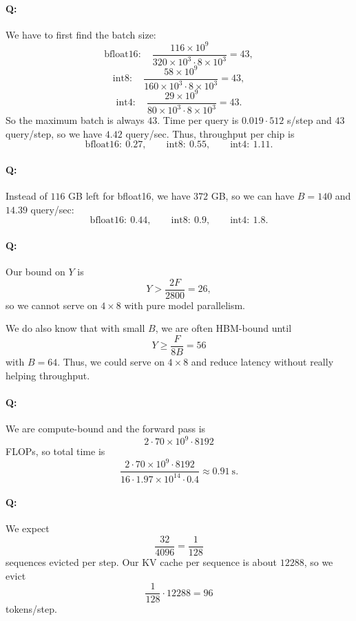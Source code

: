\documentclass[11pt]{article}
\newcommand{\B}{B}
\newcommand{\F}{F}
\newcommand{\quizbreak}{\Needspace{6\baselineskip}}
\begin{document}
\quizbreak
\paragraph{Q:}
We have to first find the batch size:
\[
  \mathrm{bfloat16:}\quad
  \frac{116\times 10^9}{320\times 10^3\cdot 8\times 10^3}
  =
  43,
\]
\[
  \mathrm{int8:}\quad
  \frac{58\times 10^9}{160\times 10^3\cdot 8\times 10^3}
  =
  43,
\]
\[
  \mathrm{int4:}\quad
  \frac{29\times 10^9}{80\times 10^3\cdot 8\times 10^3}
  =
  43.
\]
So the maximum batch is always $43$. Time per query is $0.019\cdot 512$ s/step and $43$ query/step, so we have $4.42$ query/sec. Thus, throughput per chip is
\[
  \mathrm{bfloat16:}\ 0.27,\qquad
  \mathrm{int8:}\ 0.55,\qquad
  \mathrm{int4:}\ 1.11.
\]

\quizbreak
\paragraph{Q:}
Instead of $116$ GB left for bfloat16, we have $372$ GB, so we can have $\B=140$ and $14.39$ query/sec:
\[
  \mathrm{bfloat16:}\ 0.44,\qquad
  \mathrm{int8:}\ 0.9,\qquad
  \mathrm{int4:}\ 1.8.
\]

\quizbreak
\paragraph{Q:}
Our bound on $Y$ is
\[
  Y>\frac{2\F}{2800}=26,
\]
so we cannot serve on $4\times 8$ with pure model parallelism.

We do also know that with small $\B$, we are often HBM-bound until
\[
  Y\geq \frac{\F}{8B}=56
\]
with $\B=64$. Thus, we could serve on $4\times 8$ and reduce latency without really helping throughput.

\quizbreak
\paragraph{Q:}
We are compute-bound and the forward pass is
\[
  2\cdot 70\times 10^9\cdot 8192
\]
FLOPs, so total time is
\[
  \frac{2\cdot 70\times 10^9\cdot 8192}
       {16\cdot 1.97\times 10^{14}\cdot 0.4}
  \approx 0.91\ \mathrm{s}.
\]

\quizbreak
\paragraph{Q:}
We expect
\[
  \frac{32}{4096}=\frac{1}{128}
\]
sequences evicted per step. Our KV cache per sequence is about $12288$, so we evict
\[
  \frac{1}{128}\cdot 12288
  =
  96
\]
tokens/step.
\end{document}
